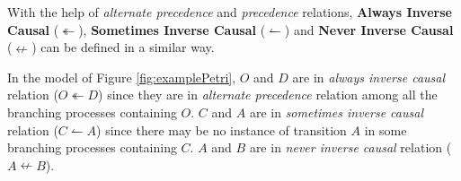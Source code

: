 \documentclass[dvips,...]{llncs}
\begin{document}
With the help of \textit{alternate precedence} and \textit{precedence} relations, \textbf{Always Inverse Causal} ($\twoheadleftarrow$), \textbf{Sometimes Inverse Causal} ($\leftharpoonup$) and \textbf{Never Inverse Causal} ($\nleftarrow$) can be defined in a similar way.




\begin{example}
In the model of Figure \ref{fig:examplePetri}, $O$ and $D$ are in \textit{always inverse causal} relation ($O\twoheadleftarrow D$) since they are in \textit{alternate precedence} relation among all the branching processes containing $O$. $C$ and $A$ are in \textit{sometimes inverse causal} relation ($C\leftharpoonup A$) since there may be no instance of transition $A$ in some branching processes containing $C$. $A$ and $B$ are in \textit{never inverse causal} relation ($A\nleftarrow B$).
\end{example}
\end{document}

